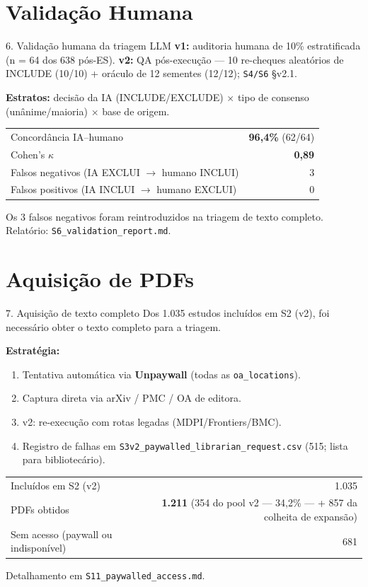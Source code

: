 \documentclass[aspectratio=169]{beamer}
\begin{document}
\section{Validação Humana}
\begin{frame}{6. Validação humana da triagem LLM}
\small
\textbf{v1:} auditoria humana de 10\% estratificada (n = 64 dos 638 pós-ES). \textbf{v2:} QA pós-execução --- 10 re-cheques aleatórios de INCLUDE (10/10) + oráculo de 12 sementes (12/12); \texttt{S4/S6} \S v2.1.

\textbf{Estratos:} decisão da IA (INCLUDE/EXCLUDE) $\times$ tipo de consenso (unânime/maioria) $\times$ base de origem.

\begin{table}
\centering
\begin{tabular}{lr}
\toprule
Concordância IA--humano & \textbf{96,4\%} (62/64) \\
Cohen's $\kappa$ & \textbf{0,89} \\
Falsos negativos (IA EXCLUI $\to$ humano INCLUI) & 3 \\
Falsos positivos (IA INCLUI $\to$ humano EXCLUI) & 0 \\
\bottomrule
\end{tabular}
\end{table}
\footnotesize Os 3 falsos negativos foram reintroduzidos na triagem de texto completo. Relatório: \texttt{S6\_validation\_report.md}.
\end{frame}

\section{Aquisição de PDFs}
\begin{frame}{7. Aquisição de texto completo}
\small
Dos 1.035 estudos incluídos em S2 (v2), foi necessário obter o texto completo para a triagem.

\textbf{Estratégia:}
\begin{enumerate}
	\item Tentativa automática via \textbf{Unpaywall} (todas as \texttt{oa\_locations}).
	\item Captura direta via arXiv / PMC / OA de editora.
	\item v2: re-execução com rotas legadas (MDPI/Frontiers/BMC).
	\item Registro de falhas em \texttt{S3v2\_paywalled\_librarian\_request.csv} (515; lista para bibliotecário).
\end{enumerate}

\begin{table}
\centering
\begin{tabular}{lr}
\toprule
Incluídos em S2 (v2) & 1.035 \\
PDFs obtidos & \textbf{1.211} (354 do pool v2 — 34,2\% — + 857 da colheita de expansão) \\
Sem acesso (paywall ou indisponível) & 681 \\
\bottomrule
\end{tabular}
\end{table}
\footnotesize Detalhamento em \texttt{S11\_paywalled\_access.md}.
\end{frame}
\end{document}
